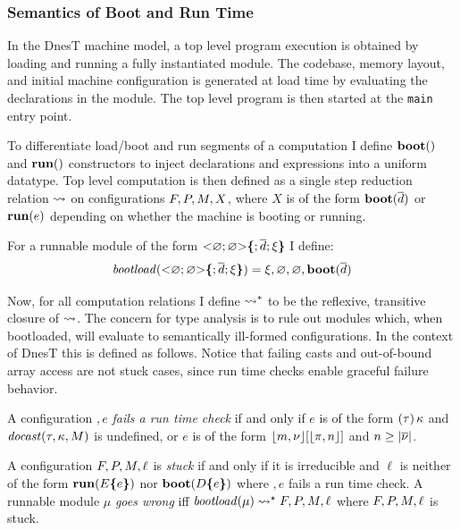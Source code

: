 \declsemanticsfig

\subsubsection{Semantics of Boot and Run Time}

In the DnesT machine model, a top level program execution is obtained by loading and running a
fully instantiated module. The codebase, memory layout, and initial machine configuration is
generated at load time by evaluating the declarations in the module. The top level program is
then started at the \texttt{main} entry point.

To differentiate load/boot and run segments of a computation I define $\mathbf{boot}()$ and
$\mathbf{run}()$ constructors to inject declarations and expressions into a uniform datatype. Top
level computation is then defined as a single step reduction relation $\leadsto$ on
configurations $F,P,M,X$, where $X$ is of the form $\mathbf{boot}(\overline{d})$ or
$\mathbf{run}(e)$ depending on whether the machine is booting or running.

\begin{definition}
\label{definition-runnable-semantics}
For a runnable module of the form $\mathrm{<}\varnothing; \varnothing \mathrm{>}\textup{\textbf{\{}} ; \overline{d};
\xi\textup{\textbf{\}}}$ I define:
$$
\mathit{bootload}(\mathrm{<}\varnothing; \varnothing \mathrm{>}\textup{\textbf{\{}} ; \overline{d}; \xi\textup{\textbf{\}}}) =
\xi,\varnothing,\varnothing, \mathbf{boot}(\overline{d})
$$
\end{definition}

Now, for all computation relations I define $\leadsto^*$ to be the reflexive, transitive closure
of $\leadsto$. The concern for type analysis is to rule out modules which, when bootloaded, will
evaluate to semantically ill-formed configurations. In the context of DnesT this is defined as
follows. Notice that failing casts and out-of-bound array access are not stuck cases, since run
time checks enable graceful failure behavior.
\begin{definition}
  A configuration $\bm, e$ \emph{fails a run time check} if and only if $e$ is of the form
  $(\tau)\,\kappa$ and $\mathit{docast}(\tau,\kappa,M)$ is undefined, or $e$ is of the form
  $\lfloor m,{\nu} \rfloor[\lfloor \pi,n \rfloor]$ and $n\ge|\overline{{\nu}}|$.
\end{definition}

\begin{definition}
  \label{definition-stuck}
  A configuration $F, P, M, \ell$ is \emph{stuck} if and only if it is irreducible
  and $\ell$ is neither of the form $\mathbf{run}(E\textup{\textbf{\{}} e\textup{\textbf{\}}})$ nor $\mathbf{boot}(D\textup{\textbf{\{}} e\textup{\textbf{\}}})$
  where $\bm, e$ fails a run time check. A runnable module $\mu$ \emph{goes wrong} iff
  $\mathit{bootload}(\mu) \leadsto^\star F, P, M, \ell $ where $F, P, M, \ell$
  is stuck.
\end{definition}

